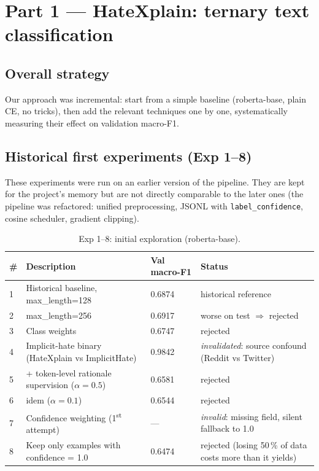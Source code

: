 \documentclass[11pt,a4paper]{article}
\begin{document}
\section{Part 1 --- HateXplain: ternary text classification}

\subsection{Overall strategy}

Our approach was incremental: start from a simple baseline (roberta-base, plain CE,
no tricks), then add the relevant techniques one by one, systematically measuring
their effect on validation macro-F1.

\subsection{Historical first experiments (Exp 1--8)}

These experiments were run on an earlier version of the pipeline. They are kept for
the project's memory but are not directly comparable to the later ones (the
pipeline was refactored: unified preprocessing, JSONL with \texttt{label\_confidence},
cosine scheduler, gradient clipping).

\begin{table}[h]
\centering\small
\caption{Exp 1--8: initial exploration (roberta-base).}
\begin{tabular}{p{0.5cm} p{6.8cm} p{2.3cm} p{2.5cm}}
\toprule
\# & Description & Val macro-F1 & Status \\
\midrule
1 & Historical baseline, max\_length=128 & 0.6874 & historical reference \\
2 & max\_length=256 & 0.6917 & worse on test $\Rightarrow$ rejected \\
3 & Class weights & 0.6747 & rejected \\
4 & Implicit-hate binary (HateXplain vs ImplicitHate) & 0.9842 &
\emph{invalidated}: source confound (Reddit vs Twitter) \\
5 & + token-level rationale supervision ($\alpha=0.5$) & 0.6581 & rejected \\
6 & idem ($\alpha=0.1$) & 0.6544 & rejected \\
7 & Confidence weighting (1\textsuperscript{st} attempt) & --- &
\emph{invalid}: missing field, silent fallback to 1.0 \\
8 & Keep only examples with confidence = 1.0 & 0.6474 &
rejected (losing 50\,\% of data costs more than it yields) \\
\bottomrule
\end{tabular}
\end{table}
\end{document}
